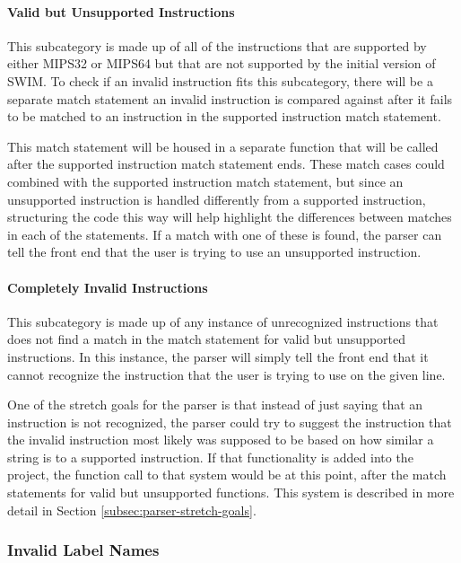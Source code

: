 \documentclass[
    paper=letter,
    parskip=half,
    fontsize=12pt,
    titlepage=firstiscover,
    toc=bibliography,
    numbers=endperiod
]{scrartcl}
\begin{document}
\paragraph{Valid but Unsupported Instructions}

This subcategory is made up of all of the instructions that are
supported by either MIPS32 or MIPS64 but that are not supported by the
initial version of SWIM. To check if an invalid instruction fits this
subcategory, there will be a separate match statement an invalid
instruction is compared against after it fails to be matched to an
instruction in the supported instruction match statement.

This match statement will be housed in a separate function that will be
called after the supported instruction match statement ends. These match
cases could combined with the supported instruction match statement, but
since an unsupported instruction is handled differently from a supported
instruction, structuring the code this way will help highlight the
differences between matches in each of the statements. If a match with
one of these is found, the parser can tell the front end that the user
is trying to use an unsupported instruction.

\paragraph{Completely Invalid Instructions}

This subcategory is made up of any instance of unrecognized instructions
that does not find a match in the match statement for valid but
unsupported instructions. In this instance, the parser will simply tell
the front end that it cannot recognize the instruction that the user is
trying to use on the given line.

One of the stretch goals for the parser is that instead of just saying
that an instruction is not recognized, the parser could try to suggest
the instruction that the invalid instruction most likely was supposed to
be based on how similar a string is to a supported instruction. If that
functionality is added into the project, the function call to that
system would be at this point, after the match statements for valid but
unsupported functions. This system is described in more detail in
Section \ref{subsec:parser-stretch-goals}.

\subsubsection{Invalid Label Names}
\label{subsec:invalid-label-names}
\end{document}

